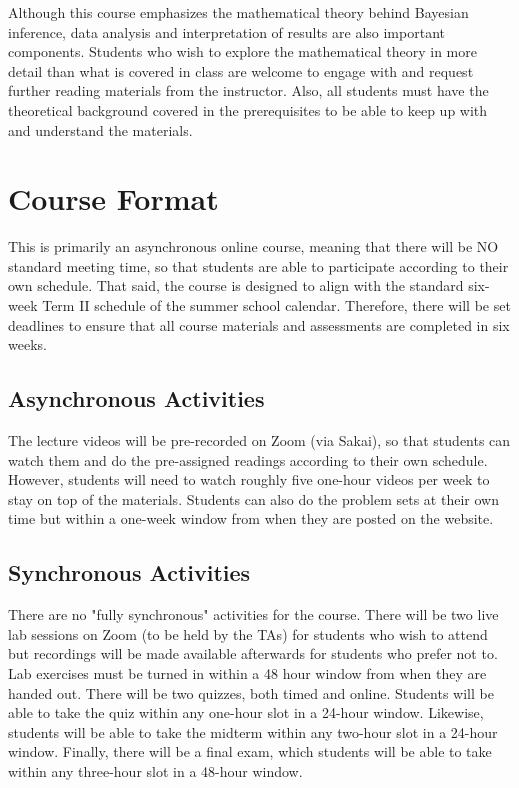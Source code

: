 \documentclass[11pt, a4paper]{article}
\begin{document}
Although this course emphasizes the mathematical theory behind Bayesian inference, data analysis and interpretation of results are also important components. Students who wish to explore the mathematical theory in more detail than what is covered in class are welcome to engage with and request further reading materials from the instructor. Also, all students must have the theoretical background covered in the prerequisites to be able to keep up with and understand the materials. 


\section{Course Format}
This is primarily an asynchronous online course, meaning that there will be NO standard meeting time, so that students are able to participate according to their own schedule. That said, the course is designed to align with the standard six-week Term II schedule of the summer school calendar. Therefore, there will be set deadlines to ensure that all course materials and assessments are completed in six weeks.

\subsection{Asynchronous Activities}
The lecture videos will be pre-recorded on Zoom (via Sakai), so that students can watch them and do the pre-assigned readings according to their own schedule.  However, students will need to watch roughly five one-hour videos per week to stay on top of the materials. Students can also do the problem sets at their own time but within a one-week window from when they are posted on the website.

\subsection{Synchronous Activities}
There are no "fully synchronous" activities for the course. There will be two live lab sessions on Zoom (to be held by the TAs) for students who wish to attend but recordings will be made available afterwards for students who prefer not to. Lab exercises must be turned in within a 48 hour window from when they are handed out. There will be two quizzes, both timed and online. Students will be able to take the quiz within any one-hour slot in a 24-hour window. Likewise, students will be able to take the midterm within any two-hour slot in a 24-hour window.  Finally, there will be a final exam, which students will be able to take within any three-hour slot in a 48-hour window. 
\end{document}
